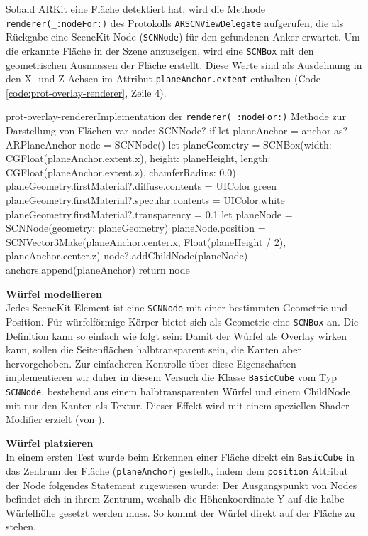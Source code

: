 \begin{description}
	Sobald ARKit eine Fläche detektiert hat, wird die Methode \texttt{renderer(\_:nodeFor:)} des Protokolls \texttt{ARSCNViewDelegate} aufgerufen, die als Rückgabe eine SceneKit Node (\texttt{SCNNode}) für den gefundenen Anker erwartet. Um die erkannte Fläche in der Szene anzuzeigen, wird eine \texttt{SCNBox} mit den geometrischen Ausmassen der Fläche erstellt. Diese Werte sind als Ausdehnung in den X- und Z-Achsen im Attribut \texttt{planeAnchor.extent} enthalten (Code \ref{code:prot-overlay-renderer}, Zeile 4). 

	\begin{code}{prot-overlay-renderer}{Implementation der \texttt{renderer(\_:nodeFor:)} Methode zur Darstellung von Flächen}
		var node:  SCNNode?
		if let planeAnchor = anchor as? ARPlaneAnchor {
			node = SCNNode()
			let planeGeometry = SCNBox(width: CGFloat(planeAnchor.extent.x), height: planeHeight, length: CGFloat(planeAnchor.extent.z), chamferRadius: 0.0)
			planeGeometry.firstMaterial?.diffuse.contents = UIColor.green
			planeGeometry.firstMaterial?.specular.contents = UIColor.white
			planeGeometry.firstMaterial?.transparency = 0.1
			let planeNode = SCNNode(geometry: planeGeometry)
			planeNode.position = SCNVector3Make(planeAnchor.center.x, Float(planeHeight / 2), planeAnchor.center.z)
			node?.addChildNode(planeNode)
			anchors.append(planeAnchor)
		}
		return node
	\end{code}

	\textbf{Würfel modellieren}\\
	Jedes SceneKit Element ist eine \texttt{SCNNode} mit einer bestimmten Geometrie und Position. Für würfelförmige Körper bietet sich als Geometrie eine \texttt{SCNBox} an. Die Definition kann so einfach wie folgt sein:
	Damit der Würfel als Overlay wirken kann, sollen die Seitenflächen halbtransparent sein, die Kanten aber hervorgehoben. Zur einfacheren Kontrolle über diese Eigenschaften implementieren wir daher in diesem Versuch die Klasse \texttt{BasicCube} vom Typ \texttt{SCNNode}, bestehend aus einem halbtransparenten Würfel und einem ChildNode mit nur den Kanten als Textur. Dieser Effekt wird mit einem speziellen Shader Modifier erzielt (von \cite{so-shader-modifier}).

	\textbf{Würfel platzieren}\\
	In einem ersten Test wurde beim Erkennen einer Fläche direkt ein \texttt{BasicCube} in das Zentrum der Fläche (\texttt{planeAnchor}) gestellt, indem dem \texttt{position} Attribut der Node folgendes Statement zugewiesen wurde:
	Der Ausgangspunkt von Nodes befindet sich in ihrem Zentrum, weshalb die Höhenkoordinate Y auf die halbe Würfelhöhe gesetzt werden muss. So kommt der Würfel direkt auf der Fläche zu stehen.


\end{description}
